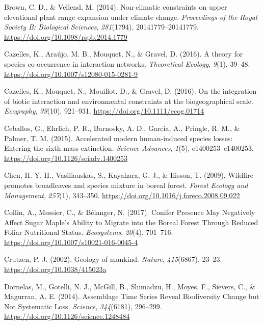 \documentclass[
]{article}
\begin{document}
\leavevmode\hypertarget{ref-brown_non-climatic_2014}{}%
Brown, C. D., \& Vellend, M. (2014). Non-climatic constraints on upper
elevational plant range expansion under climate change.
\emph{Proceedings of the Royal Society B: Biological Sciences},
\emph{281}(1794), 20141779--20141779.
\url{https://doi.org/10.1098/rspb.2014.1779}

\leavevmode\hypertarget{ref-cazelles_theory_2016}{}%
Cazelles, K., Araújo, M. B., Mouquet, N., \& Gravel, D. (2016). A theory
for species co-occurrence in interaction networks. \emph{Theoretical
Ecology}, \emph{9}(1), 39--48.
\url{https://doi.org/10.1007/s12080-015-0281-9}

\leavevmode\hypertarget{ref-cazelles_integration_2016}{}%
Cazelles, K., Mouquet, N., Mouillot, D., \& Gravel, D. (2016). On the
integration of biotic interaction and environmental constraints at the
biogeographical scale. \emph{Ecography}, \emph{39}(10), 921--931.
\url{https://doi.org/10.1111/ecog.01714}

\leavevmode\hypertarget{ref-ceballos_accelerated_2015}{}%
Ceballos, G., Ehrlich, P. R., Barnosky, A. D., Garcia, A., Pringle, R.
M., \& Palmer, T. M. (2015). Accelerated modern human-induced species
losses: Entering the sixth mass extinction. \emph{Science Advances},
\emph{1}(5), e1400253--e1400253.
\url{https://doi.org/10.1126/sciadv.1400253}

\leavevmode\hypertarget{ref-chen_wildfire_2009}{}%
Chen, H. Y. H., Vasiliauskas, S., Kayahara, G. J., \& Ilisson, T.
(2009). Wildfire promotes broadleaves and species mixture in boreal
forest. \emph{Forest Ecology and Management}, \emph{257}(1), 343--350.
\url{https://doi.org/10.1016/j.foreco.2008.09.022}

\leavevmode\hypertarget{ref-collin_conifer_2017}{}%
Collin, A., Messier, C., \& Bélanger, N. (2017). Conifer Presence May
Negatively Affect Sugar Maple's Ability to Migrate into the Boreal
Forest Through Reduced Foliar Nutritional Status. \emph{Ecosystems},
\emph{20}(4), 701--716. \url{https://doi.org/10.1007/s10021-016-0045-4}

\leavevmode\hypertarget{ref-crutzen_geology_2002}{}%
Crutzen, P. J. (2002). Geology of mankind. \emph{Nature},
\emph{415}(6867), 23--23. \url{https://doi.org/10.1038/415023a}

\leavevmode\hypertarget{ref-dornelas_assemblage_2014}{}%
Dornelas, M., Gotelli, N. J., McGill, B., Shimadzu, H., Moyes, F.,
Sievers, C., \& Magurran, A. E. (2014). Assemblage Time Series Reveal
Biodiversity Change but Not Systematic Loss. \emph{Science},
\emph{344}(6181), 296--299.
\url{https://doi.org/10.1126/science.1248484}
\end{document}
